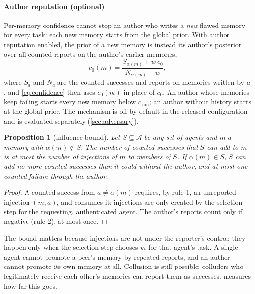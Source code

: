 \documentclass[5p,times,twocolumn]{elsarticle}
\newtheorem{proposition}{Proposition}
\begin{document}
\paragraph{Author reputation (optional)}
Per-memory confidence cannot stop an author who writes a \emph{new} flawed memory for every task: each new memory starts from the global prior. With author reputation enabled, the prior of a new memory is instead its author's posterior over all counted reports on the author's earlier memories,
\begin{equation}
c_0(m) = \frac{S_{\alpha(m)} + w\,c_0}{N_{\alpha(m)} + w},
\label{eq:author}
\end{equation}
where $S_a$ and $N_a$ are the counted successes and reports on memories written by $a$, and \cref{eq:confidence} then uses $c_0(m)$ in place of $c_0$. An author whose memories keep failing starts every new memory below $c_{\min}$; an author without history starts at the global prior. The mechanism is off by default in the released configuration and is evaluated separately (\cref{sec:adversary}).

\begin{proposition}[Influence bound]
\label{prop:bound}
Let $S \subseteq \mathcal{A}$ be any set of agents and $m$ a memory with $\alpha(m) \notin S$. The number of counted successes that $S$ can add to $m$ is at most the number of injections of $m$ to members of $S$. If $\alpha(m) \in S$, $S$ can add no more counted successes than it could without the author, and at most one counted failure through the author.
\end{proposition}
\begin{proof}
A counted success from $a \neq \alpha(m)$ requires, by rule 1, an unreported injection $(m,a)$, and consumes it; injections are only created by the selection step for the requesting, authenticated agent. The author's reports count only if negative (rule 2), at most once.
\end{proof}

The bound matters because injections are not under the reporter's control: they happen only when the selection step chooses $m$ for that agent's task. A single agent cannot promote a peer's memory by repeated reports, and an author cannot promote its own memory at all. Collusion is still possible: colluders who legitimately receive each other's memories can report them as successes.  measures how far this goes.
\end{document}
